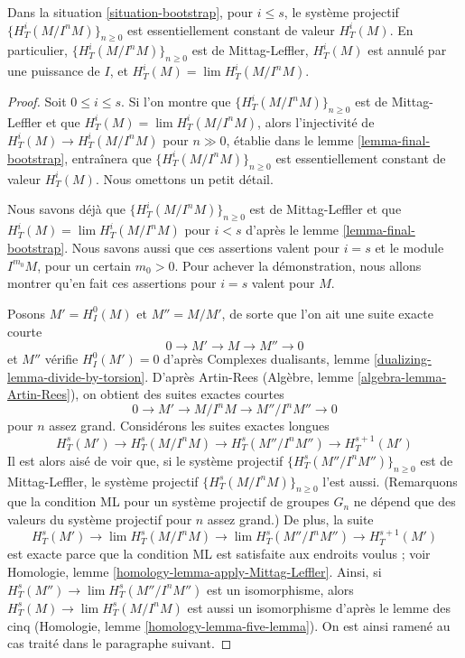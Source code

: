 \begin{theorem}
\label{theorem-final-bootstrap}
Dans la situation \ref{situation-bootstrap}, pour $i \leq s$, le système projectif
$\{H^i_T(M/I^nM)\}_{n \geq 0}$ est essentiellement constant de valeur $H^i_T(M)$.
En particulier, $\{H^i_T(M/I^nM)\}_{n \geq 0}$ est de Mittag-Leffler,
$H^i_T(M)$ est annulé par une puissance de $I$, et
$H^i_T(M) = \lim H^i_T(M/I^nM)$.
\end{theorem}

\begin{proof}
Soit $0 \leq i \leq s$.
Si l'on montre que $\{H^i_T(M/I^nM)\}_{n \geq 0}$ est de Mittag-Leffler et que
$H^i_T(M) = \lim H^i_T(M/I^nM)$, alors l'injectivité de
$H^i_T(M) \to H^i_T(M/I^nM)$ pour $n \gg 0$, établie dans le
lemme \ref{lemma-final-bootstrap}, entraînera que
$\{H^i_T(M/I^nM)\}_{n \geq 0}$ est essentiellement constant de valeur $H^i_T(M)$.
Nous omettons un petit détail.

\medskip\noindent
Nous savons déjà que $\{H^i_T(M/I^nM)\}_{n \geq 0}$ est de Mittag-Leffler et que
$H^i_T(M) = \lim H^i_T(M/I^nM)$ pour $i < s$ d'après le
lemme \ref{lemma-final-bootstrap}. Nous savons aussi que ces assertions valent
pour $i = s$ et le module $I^{m_0}M$, pour un certain $m_0 > 0$.
Pour achever la démonstration, nous allons montrer qu'en fait ces
assertions pour $i = s$ valent pour $M$.

\medskip\noindent
Posons $M' = H^0_I(M)$ et $M'' = M/M'$, de sorte que l'on ait une suite
exacte courte
$$
0 \to M' \to M \to M'' \to 0
$$
et $M''$ vérifie $H^0_I(M') = 0$ d'après
Complexes dualisants, lemme \ref{dualizing-lemma-divide-by-torsion}.
D'après Artin-Rees (Algèbre, lemme \ref{algebra-lemma-Artin-Rees}),
on obtient des suites exactes courtes
$$
0 \to M' \to M/I^n M \to M''/I^n M'' \to 0
$$
pour $n$ assez grand. Considérons les suites exactes longues
$$
H^s_T(M') \to
H^s_T(M/I^nM) \to
H^s_T(M''/I^nM'') \to
H^{s + 1}_T(M')
$$
Il est alors aisé de voir que, si le système projectif
$\{H^s_T(M''/I^nM'')\}_{n \geq 0}$ est de Mittag-Leffler,
le système projectif
$\{H^s_T(M/I^nM)\}_{n \geq 0}$ l'est aussi.
(Remarquons que la condition ML pour un système projectif de groupes $G_n$
ne dépend que des valeurs du système projectif pour $n$ assez grand.)
De plus, la suite
$$
H^s_T(M') \to
\lim H^s_T(M/I^nM) \to
\lim H^s_T(M''/I^nM'') \to
H^{s + 1}_T(M')
$$
est exacte parce que la condition ML est satisfaite aux endroits voulus ; voir
Homologie, lemme \ref{homology-lemma-apply-Mittag-Leffler}.
Ainsi, si $H^s_T(M'') \to \lim H^s_T(M''/I^nM'')$
est un isomorphisme, alors
$H^s_T(M) \to \lim H^s_T(M/I^nM)$
est aussi un isomorphisme d'après le lemme des cinq
(Homologie, lemme \ref{homology-lemma-five-lemma}).
On est ainsi ramené au cas traité dans le paragraphe suivant.


\end{proof}
